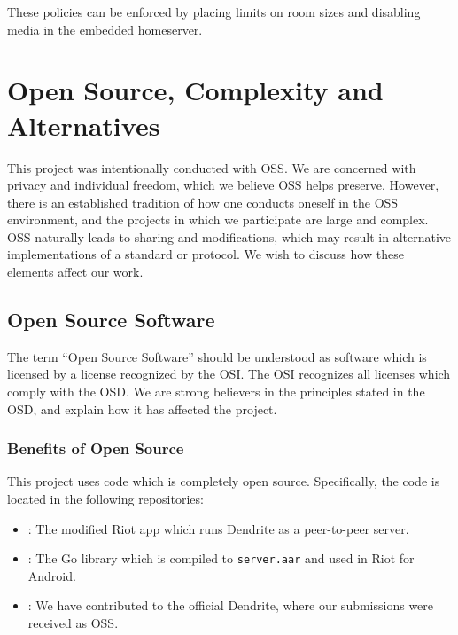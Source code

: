 These policies can be enforced by placing limits on room sizes and disabling media in the embedded homeserver.


\chapter{Open Source, Complexity and Alternatives}\label{chp:open_source_complexity_alternatives}
This project was intentionally conducted with \ac{OSS}.
We are concerned with privacy and individual freedom, which we believe \ac{OSS} helps preserve.
However, there is an established tradition of how one conducts oneself in the \ac{OSS} environment, and the projects in which we participate are large and complex.
\ac{OSS} naturally leads to sharing and modifications, which may result in alternative implementations of a standard or protocol.
We wish to discuss how these elements affect our work.

\section{Open Source Software}\label{sec:open_source}
The term ``Open Source Software'' should be understood as software which is licensed by a license recognized by the \ac{OSI}\cite{open_source_initiative}.
The \ac{OSI} recognizes all licenses which comply with the \ac{OSD}\cite{open_source_definition}.
We are strong believers in the principles stated in the \ac{OSD}, and explain how it has affected the project.

\subsection{Benefits of Open Source}\label{subsec:benefits_of_open_source}
This project uses code which is completely open source.
Specifically, the code is located in the following repositories:
\begin{itemize}
	\item{
	      :
	      The modified Riot app which runs Dendrite as a peer-to-peer server.
	      }
	\item{
	      :
	      The Go library which is compiled to \texttt{server.aar} and used in Riot for Android.
	      }
	\item{
	      :
	      We have contributed to the official Dendrite, where our submissions were received as \ac{OSS}.
	      }
\end{itemize}


